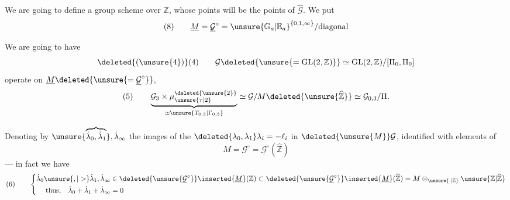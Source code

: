 We are going to define a group scheme  over $\mathbb{Z}$, whose points will be  the points of $\widehat{\mathcal{G}}$. We put
\[
(8)\qquad
\underline{M}=\underline{\mathcal{G}}^{\circ}
=\unsure{\mathbb{G}_a|\mathbb{E}_a}^{\{0,1,\infty\}}/\text{diagonal}
\]

We are going to have 
\[
\deleted{(\unsure{4})}(4)\qquad
\mathcal{G}\deleted{\unsure{=\operatorname{GL}(2,\mathbb{Z})}}
\simeq\operatorname{GL}(2,\mathbb{Z})/[\Pi_0,\Pi_0]
\]
operate on $\underline{M}\deleted{\unsure{=\underline{\mathcal{G}}^{\circ}}}$,
 
\[
(5)\qquad
\underbrace{\mathcal{G}_3\times\mu_{\unsure{\tau|2}}^{\deleted{\unsure{2}}}}_{\simeq\unsure{T_{0,3}|\Gamma_{0,3}}}
\simeq\mathcal{G}/M\deleted{\unsure{\widehat{\mathbb{Z}}}}
\simeq\mathcal{G}_{0,3}/\Pi.
\]

Denoting by $\unsure{\overbrace{\dot{\lambda}_0,\dot{\lambda}_1}},\dot{\lambda}_\infty$ the images of the
$\deleted{\lambda_0,\lambda_1}\lambda_i=-\ell_i$ in $\deleted{\unsure{M}}\mathcal{G}$, identified with elements of
\[
M=\mathcal{G}^{\circ}=\underline{\mathcal{G}}^{\circ}(\widehat{\mathbb{Z}})
\]
--- in fact we have
\[
(6)\qquad
\left\{
\begin{aligned}
\dot{\lambda}_0\unsure{,|>}\dot{\lambda}_1,\dot{\lambda}_\infty
&\in\deleted{\unsure{\underline{\mathcal{G}}^{\circ}}}\inserted{\underline{M}}(\mathbb{Z})
\subset\deleted{\unsure{\underline{\mathcal{G}}^{\circ}}}\inserted{\underline{M}}(\widehat{\mathbb{Z}})
=M\otimes_{\unsure{\cdot|\mathbb{Z}}}\unsure{\mathbb{Z}|\widehat{\mathbb{Z}}}\\
\text{thus,}\quad\dot{\lambda}_0+\dot{\lambda}_1+\dot{\lambda}_\infty&=0
\end{aligned}\right.
\]

